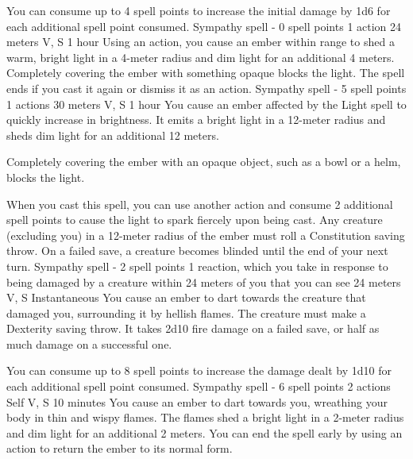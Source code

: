         You can consume up to 4 spell points to increase the initial damage by 1d6 for each additional spell point consumed.
        {Sympathy spell - 0 spell points}
        {1 action}
        {24 meters}
        {V, S}
        {1 hour}
        Using an action, you cause an ember within range to shed a warm, bright light in a 4-meter radius and dim light for an additional 4 meters.
        Completely covering the ember with something opaque blocks the light.
        The spell ends if you cast it again or dismiss it as an action.
        {Sympathy spell - 5 spell points}
        {1 actions}
        {30 meters}
        {V, S}
        {1 hour}
        You cause an ember affected by the Light spell to quickly increase in brightness.
        It emits a bright light in a 12-meter radius and sheds dim light for an additional 12 meters.

        Completely covering the ember with an opaque object, such as a bowl or a helm, blocks the light.

        When you cast this spell, you can use another action and consume 2 additional spell points to cause the light to spark fiercely upon being cast.
        Any creature (excluding you) in a 12-meter radius of the ember must roll a Constitution saving throw.
        On a failed save, a creature becomes blinded until the end of your next turn.
        {Sympathy spell - 2 spell points}
        {1 reaction, which you take in response to being damaged by a creature within 24 meters of you that you can see}
        {24 meters}
        {V, S}
        {Instantaneous}
        You cause an ember to dart towards the creature that damaged you, surrounding it by hellish flames.
        The creature must make a Dexterity saving throw.
        It takes 2d10 fire damage on a failed save, or half as much damage on a successful one.

        You can consume up to 8 spell points to increase the damage dealt by 1d10 for each additional spell point consumed.
        {Sympathy spell - 6 spell points}
        {2 actions}
        {Self}
        {V, S}
        {10 minutes}
        You cause an ember to dart towards you, wreathing your body in thin and wispy flames.
        The flames shed a bright light in a 2-meter radius and dim light for an additional 2 meters.
        You can end the spell early by using an action to return the ember to its normal form.

